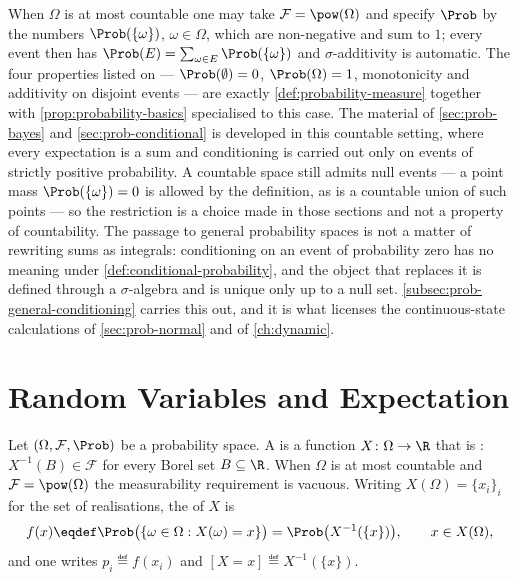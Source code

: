 \begin{remark}\label{rem:discrete-probability}
	When $\Omega$ is at most countable one may take $\mathcal{F}=\pow(\Omega)$ and specify
	$\Prob$ by the numbers $\Prob(\{\omega\})$, $\omega\in\Omega$, which are
	non-negative and sum to $1$; every event then has
	$\Prob(E)=\sum_{\omega\in E}\Prob(\{\omega\})$ and $\sigma$-additivity is
	automatic. The four properties listed on
	\autocite[slide 4]{fukuda2026probability} --- $\Prob(\emptyset)=0$,
	$\Prob(\Omega)=1$, monotonicity and additivity on disjoint events --- are exactly
	\autoref{def:probability-measure} together with
	\autoref{prop:probability-basics} specialised to this case. The material of
	\autoref{sec:prob-bayes} and \autoref{sec:prob-conditional} is developed in this
	countable setting, where every expectation is a sum and conditioning is
	carried out only on events of strictly positive probability. A countable
	space still admits null events --- a point mass $\Prob(\{\omega\})=0$ is
	allowed by the definition, as is a countable union of such points --- so the
	restriction is a choice made in those sections and not a property of
	countability. The passage to general probability spaces is not a
	matter of rewriting sums as integrals: conditioning on an event of probability
	zero has no meaning under \autoref{def:conditional-probability}, and the object
	that replaces it is defined through a $\sigma$-algebra and is unique only up to
	a null set. \autoref{subsec:prob-general-conditioning} carries this out, and it
	is what licenses the continuous-state calculations of
	\autoref{sec:prob-normal} and of \autoref{ch:dynamic}.
\end{remark}

\section{Random Variables and Expectation}\label{sec:prob-rv}

\begin{definition}\label{def:random-variable}
	Let $(\Omega,\mathcal{F},\Prob)$ be a probability space. A  is a function $X\colon\Omega\to\R$ that is
	: $X^{-1}(B)\in\mathcal{F}$ for every Borel set
	$B\subseteq\R$. When $\Omega$ is at most countable and $\mathcal{F}=\pow(\Omega)$ the
	measurability requirement is vacuous. Writing $X(\Omega)=\{x_i\}_{i}$ for the
	set of realisations, the  of $X$ is
	\begin{equation}\label{eq:pmf}
		f(x)\eqdef\Prob\bigl(\{\omega\in\Omega : X(\omega)=x\}\bigr)
		=\Prob\bigl(X^{-1}(\{x\})\bigr),\qquad x\in X(\Omega),
	\end{equation}
	and one writes $p_i\eqdef f(x_i)$ and $[X=x]\eqdef X^{-1}(\{x\})$.
\end{definition}

